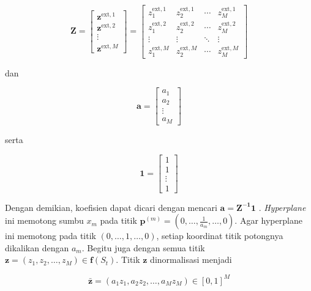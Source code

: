 \begin{equation}
  \mathbf{Z} = 
  \begin{bmatrix}
    \mathbf{z}^{\text{ext},1}\\
    \mathbf{z}^{\text{ext},2}\\
    \vdots\\
    \mathbf{z}^{\text{ext},M}
  \end{bmatrix} = 
  \begin{bmatrix}
    z^{\text{ext},1}_1 & z^{\text{ext},1}_2 & \cdots & z^{\text{ext},1}_M \\
    z^{\text{ext},2}_1 & z^{\text{ext},2}_2 & \cdots & z^{\text{ext},2}_M \\
    \vdots & \vdots & \ddots & \vdots \\
    z^{\text{ext},M}_1 & z^{\text{ext},M}_2 & \cdots & z^{\text{ext},M}_M
  \end{bmatrix}
\end{equation}

dan

\begin{equation}
  \mathbf{a} = 
  \begin{bmatrix}
    a_1 \\
    a_2 \\
    \vdots \\
    a_M
  \end{bmatrix}
\end{equation}

serta

\begin{equation}
  \mathbf{1} =
  \begin{bmatrix}
    1 \\
    1 \\
    \vdots \\
    1
  \end{bmatrix}
\end{equation}

Dengan demikian, koefisien dapat dicari dengan mencari $\mathbf{a=Z^{-1}1}$ .
\textit{Hyperplane} ini memotong sumbu $x_m$ pada titik $\mathbf{p}^{(m)}=(0,\dots,\frac{1}{a_m},\dots,0)$. Agar hyperplane ini memotong pada titik $(0,\dots,1,\dots,0)$, setiap koordinat titik potongnya dikalikan dengan $a_m$. Begitu juga dengan semua titik $\mathbf{z} = (z_1,z_2,\dots,z_M) \in \mathbf{f}(S_t)$. Titik $\mathbf{z}$ dinormalisasi menjadi 

\begin{equation}
  \bar{\mathbf{z}}=(a_1z_1,a_2z_2,\dots,a_Mz_M) \in [0,1]^M
\end{equation}

